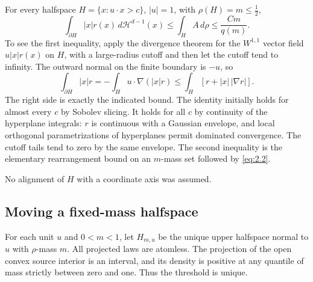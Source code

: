 For every halfspace $H=\{x:u\cdot x>c\}$, $|u|=1$, with $\rho(H)=m\le\tfrac12$,
\begin{equation}
  \int_{\partial H}|x|r(x)\,d\mathcal H^{d-1}(x)
  \le\int_H A\,d\rho
  \le\frac{Cm}{q(m)}.
  \tag{2.4}\label{eq:2.4}
\end{equation}
To see the first inequality, apply the divergence theorem for the $W^{1,1}$ vector field $u|x|r(x)$ on $H$, with a large-radius cutoff and then let the cutoff tend to infinity. The outward normal on the finite boundary is $-u$, so
\[
  \int_{\partial H}|x|r
  =-\int_H u\cdot\nabla(|x|r)
  \le\int_H[r+|x|\,|\nabla r|].
\]
The right side is exactly the indicated bound. The identity initially holds for almost every $c$ by Sobolev slicing. It holds for all $c$ by continuity of the hyperplane integrals: $r$ is continuous with a Gaussian envelope, and local orthogonal parametrizations of hyperplanes permit dominated convergence. The cutoff tails tend to zero by the same envelope. The second inequality is the elementary rearrangement bound on an $m$-mass set followed by \eqref{eq:2.2}.

No alignment of $H$ with a coordinate axis was assumed.

\subsection{Moving a fixed-mass halfspace}\label{sec:2.3}

For each unit $u$ and $0<m<1$, let $H_{m,u}$ be the unique upper halfspace normal to $u$ with $\rho$-mass $m$. All projected laws are atomless. The projection of the open convex source interior is an interval, and its density is positive at any quantile of mass strictly between zero and one. Thus the threshold is unique.

